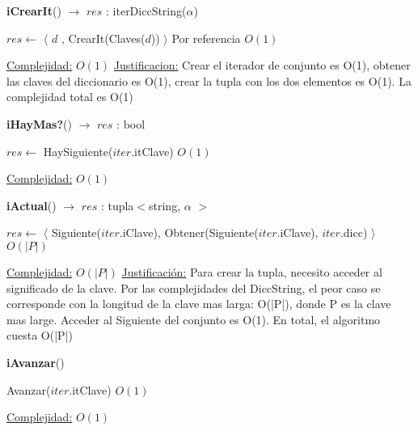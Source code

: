 \begin{Algoritmos}



\begin{algorithm}[H]
{\textbf{iCrearIt}() $\to$ $res$ : iterDiccString($\alpha$)}
\begin{algorithmic}[1]

\State $res \gets$ $\langle$ $d$ , CrearIt(Claves($d$)) $\rangle$ \Comment Por referencia $O(1)$
 
\medskip
\Statex \underline{Complejidad:} $O(1)$
\Statex \underline{Justificacion:} Crear el iterador de conjunto es O(1), obtener las claves del diccionario es O(1), crear la tupla con los dos elementos es O(1). La complejidad total es O(1)
\end{algorithmic}
\end{algorithm}



\begin{algorithm}[H]
{\textbf{iHayMas?}() $\to$ $res$ : bool}
\begin{algorithmic}[1]

\State $res \gets$ HaySiguiente($iter$.itClave) \Comment $O(1)$

\medskip
\Statex \underline{Complejidad:} $O(1)$
\end{algorithmic}
\end{algorithm}



\begin{algorithm}[H]
{\textbf{iActual}() $\to$ $res$ : tupla$<$string, $\alpha$ $>$}
\begin{algorithmic}[1]

\State $res \gets$ $\langle$ Siguiente($iter$.iClave), Obtener(Siguiente($iter$.iClave), $iter$.dicc) $\rangle$ \Comment $O(|P|)$

\medskip
\Statex \underline{Complejidad:} $O(|P|)$
\Statex \underline{Justificaci\'on:} Para crear la tupla, necesito acceder al significado de la clave. Por las complejidades del DiccString, el peor caso se corresponde con la longitud de la clave mas larga: O(|P|), donde P es la clave mas large. Acceder al Siguiente del conjunto es O(1). En total, el algoritmo cuesta O(|P|)

\end{algorithmic}
\end{algorithm}



\begin{algorithm}[H]
{\textbf{iAvanzar}()}
\begin{algorithmic}[1]

\State Avanzar($iter$.itClave) \Comment $O(1)$

\medskip
\Statex \underline{Complejidad:} $O(1)$

\end{algorithmic}
\end{algorithm}

\end{Algoritmos}  
  
